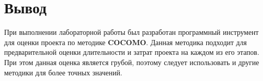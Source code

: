 \section{Вывод}

При выполнении лабораторной работы был разработан программный инструмент для оценки проекта по методике \textbf{COCOMO}. Данная методика подходит для предварительной оценки длительности и затрат проекта на каждом из его этапов. При этом данная оценка является грубой, поэтому следует использовать и другие методики для более точных значений.